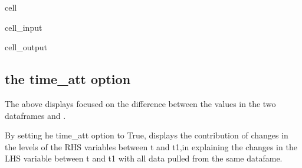 \documentclass[letterpaper,10pt,english]{jupyterBook}
\begin{document}
\begin{sphinxuseclass}{cell}\begin{sphinxVerbatimInput}

\begin{sphinxuseclass}{cell_input}
\begin{sphinxVerbatim}[commandchars=\\\{\}]
 
     
\end{sphinxVerbatim}

\end{sphinxuseclass}\end{sphinxVerbatimInput}
\begin{sphinxVerbatimOutput}

\begin{sphinxuseclass}{cell_output}
\noindent{}

\end{sphinxuseclass}\end{sphinxVerbatimOutput}

\end{sphinxuseclass}

\subsection{the time\_att option}
\label{\detokenize{content/06_ModelAnalytics/AttributionSomeFeatures:the-time-att-option}}
\sphinxAtStartPar
The above displays focused on the difference between the values in the two dataframes  and .

\sphinxAtStartPar
By setting he time\_att option to True,  displays the contribution of changes in the levels of the RHS variables between t and t\sphinxhyphen{}1,in explaining the changes in the LHS variable between t and t\sphinxhyphen{}1 with all data pulled from the same  datafame.
\end{document}
